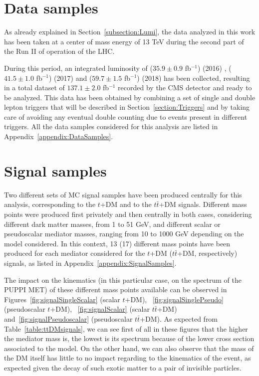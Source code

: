 \documentclass[a4paper, 10pt, openright]{report}
\begin{document}
\section{Data samples} \label{section:Data}

As already explained in Section~\ref{subsection:Lumi}, the data analyzed in this work has been taken at a center of mass energy of 13 TeV during the second part of the Run II of operation of the \ac{LHC}. 

During this period, an integrated luminosity of ($35.9 \pm 0.9$ fb$^{-1}$) (2016) \cite{Lumi2016}, ($41.5 \pm 1.0$ fb$^{-1}$) (2017) \cite{Lumi2017} and ($59.7 \pm 1.5$ fb$^{-1}$) (2018) \cite{Lumi2018} has been collected, resulting in a total dataset of $137.1 \pm 2.0$ fb$^{-1}$ recorded by the \ac{CMS} detector and ready to be analyzed. This data has been obtained by combining a set of single and double lepton triggers that will be described in Section~\ref{section:Triggers} and by taking care of avoiding any eventual double counting due to events present in different triggers. All the data samples considered for this analysis are listed in Appendix~\ref{appendix:DataSamples}.

\section{Signal samples} \label{section:Signals}

Two different sets of \ac{MC} signal samples have been produced centrally for this analysis, corresponding to the $t$+DM and to the $t \bar t$+DM signals. Different mass points were produced first privately and then centrally in both cases, considering different dark matter masses, from 1 to 51 GeV, and different scalar or pseudoscalar mediator masses, ranging from 10 to 1000 GeV depending on the model considered. In this context, 13 (17) different mass points have been produced for each mediator considered for the $t$+DM ($t \bar t$+DM, respectively) signals, as listed in Appendix~\ref{appendix:SignalSamples}.

The impact on the kinematics (in this particular case, on the spectrum of the \ac{PUPPI} \ac{MET}) of these different mass points available can be observed in Figures~\ref{fig:signalSingleScalar} (scalar $t$+DM), ~\ref{fig:signalSinglePseudo} (pseudoscalar $t$+DM), ~\ref{fig:signalScalar} (scalar $t \bar t$+DM) and~\ref{fig:signalPseudoscalar} (pseudoscalar $t \bar t$+DM). As expected from Table~\ref{table:ttDMsignals}, we can see first of all in these figures that the higher the mediator mass is, the lowest is its spectrum because of the lower cross section associated to the model. On the other hand, we can also observe that the mass of the \ac{DM} itself has little to no impact regarding to the kinematics of the event, as expected given the decay of such exotic matter to a pair of invisible particles.
\end{document}
